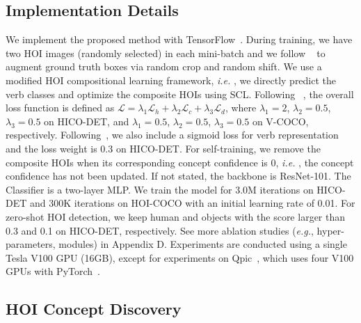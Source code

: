\documentclass[runningheads]{llncs}
\newcommand{\ie}{\textit{i.e. }}
\newcommand{\eg}{\textit{e.g.}}
\begin{document}
\subsection{Implementation Details}
\label{sec:impl_detail}
We implement the proposed method with TensorFlow~\cite{abadi2016tensorflow}.
During training, we have two HOI images (randomly selected) in each mini-batch and we follow ~\cite{gao2018ican} to augment ground truth boxes via random crop and random shift. We use a modified HOI compositional learning framework, \ie, we directly predict the verb classes and optimize the composite HOIs using SCL. Following ~\cite{hou2020visual,hou2021fcl}, the overall loss function is defined as $\mathcal{L} = \lambda_1 \mathcal{L}_{h} + \lambda_2 \mathcal{L}_{c} + \lambda_3 \mathcal{L}_d$, where $\lambda_1 = 2$, $\lambda_2 = 0.5$, $\lambda_3=0.5$ on HICO-DET, and $\lambda_1 = 0.5$, $\lambda_2 = 0.5$, $\lambda_3=0.5$ on V-COCO, respectively. Following~\cite{hou2021fcl}, we also include a sigmoid loss for verb representation and the loss weight is $0.3$ on HICO-DET.
For self-training, we remove the composite HOIs when its corresponding concept confidence is 0, \ie, the concept confidence has not been updated. If not stated, the backbone is ResNet-101. The Classifier is a two-layer MLP. We train the model for 3.0M iterations on HICO-DET and 300K iterations on HOI-COCO with an initial learning rate of 0.01. For zero-shot HOI detection, we keep human and objects with the score larger than 0.3 and 0.1 on HICO-DET, respectively. See more ablation studies (\eg, hyper-parameters, modules) in Appendix D. Experiments are conducted using a single Tesla V100 GPU (16GB), except for experiments on Qpic~\cite{tamura_cvpr2021}, which uses four V100 GPUs with PyTorch~\cite{NEURIPS2019_9015}.



\subsection{HOI Concept Discovery}
\end{document}
